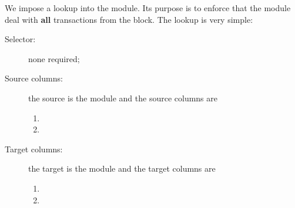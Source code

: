 We impose a lookup into the \hubMod{} module. Its purpose is to enforce that the \hubMod{} module deal with \textbf{all} transactions from the block. The lookup is very simple:
\begin{description}
	\item[Selector:] none required;
	\item[Source columns:]
		the source is the \userTxnDataMod{} module and the source columns are
		\begin{multicols}{2}
			\begin{enumerate}
				\item \locBlock{}
				\item \locAbs{}
			\end{enumerate}
		\end{multicols}
	\item[Target columns:]
		the target is the \hubMod{} module and the target columns are
		\begin{multicols}{2}
			\begin{enumerate}
				\item \blockNumber{}
				\item \userTransactionNumber{}
			\end{enumerate}
		\end{multicols}
\end{description}
